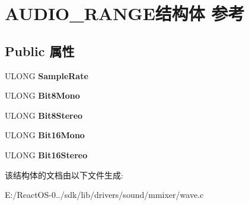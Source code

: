 \hypertarget{struct_a_u_d_i_o___r_a_n_g_e}{}\section{A\+U\+D\+I\+O\+\_\+\+R\+A\+N\+G\+E结构体 参考}
\label{struct_a_u_d_i_o___r_a_n_g_e}
\subsection*{Public 属性}
\begin{DoxyCompactItemize}
\item 
\mbox{\label{struct_a_u_d_i_o___r_a_n_g_e_a0008e1152e9c1e8a927b5a5c57e06376}} 
U\+L\+O\+NG {\bfseries Sample\+Rate}
\item 
\mbox{\label{struct_a_u_d_i_o___r_a_n_g_e_aa612dbb9bd71749ad49ebb70c50df7b5}} 
U\+L\+O\+NG {\bfseries Bit8\+Mono}
\item 
\mbox{\label{struct_a_u_d_i_o___r_a_n_g_e_a30a3cff9f5dc1d90a5c77b3a7eee4a7a}} 
U\+L\+O\+NG {\bfseries Bit8\+Stereo}
\item 
\mbox{\label{struct_a_u_d_i_o___r_a_n_g_e_a03e01d1613071566b8d3d802c61d9ecd}} 
U\+L\+O\+NG {\bfseries Bit16\+Mono}
\item 
\mbox{\label{struct_a_u_d_i_o___r_a_n_g_e_a614ec780a4e26309d351ac153cf4e42e}} 
U\+L\+O\+NG {\bfseries Bit16\+Stereo}
\end{DoxyCompactItemize}


该结构体的文档由以下文件生成\+:\begin{DoxyCompactItemize}
\item 
E\+:/\+React\+O\+S-\/0../sdk/lib/drivers/sound/mmixer/wave.\+c\end{DoxyCompactItemize}
